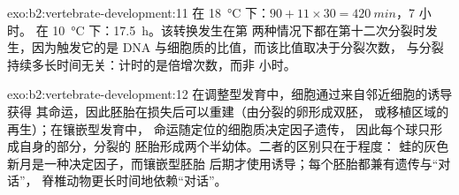 \begin{solution}{exo:b2:vertebrate-development:11}
在 \qty{18}{\celsius} 下：$90 + 11\times 30 = \qty{420}{min}$，7 小时。
在 \qty{10}{\celsius} 下：\qty{17.5}{h}。该转换发生在第
两种情况下都在第十二次分裂时发生，因为触发它的是
DNA 与细胞质的比值，而该比值取决于分裂次数，
与分裂持续多长时间无关：计时的是倍增次数，而非
小时。
\end{solution}

\begin{solution}{exo:b2:vertebrate-development:12}
在调整型发育中，细胞通过来自邻近细胞的诱导获得
其命运，因此胚胎在损失后可以重建（由分裂的卵形成双胚，
或移植区域的再生）；在镶嵌型发育中，
命运随定位的细胞质决定因子遗传，
因此每个球只形成自身的部分，分裂的
胚胎形成两个半幼体。二者的区别只在于程度：
蛙的灰色新月是一种决定因子，而镶嵌型胚胎
后期才使用诱导；每个胚胎都兼有遗传与“对话”，
脊椎动物更长时间地依赖“对话”。
\end{solution}

